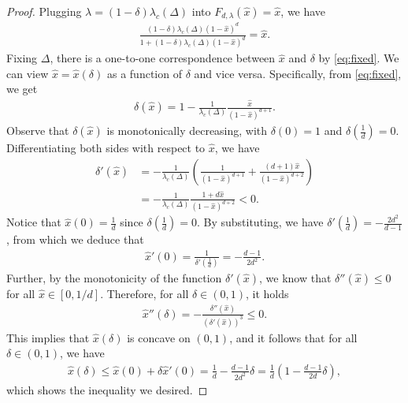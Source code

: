 \documentclass[10pt,a4paper]{amsart}
\newcommand{\tp}{\tuple}
\newcommand{\tuple}[1]{\left(#1\right)}
\begin{document}
\begin{proof}
    Plugging $\lambda = (1-\delta) \lambda_c(\Delta)$ into $F_{d,\lambda}(\hat x)=\hat x$, we have
    \begin{align} \label{eq:fixed}
        \frac{(1-\delta)\lambda_c(\Delta)(1-\hat x)^d}{1+(1-\delta)\lambda_c(\Delta)(1-\hat x)^d}=\hat x.
    \end{align} 
    Fixing $\Delta$, there is a one-to-one correspondence between $\hat x$ and $\delta$ by \cref{eq:fixed}.
    We can view $\hat x = \hat x (\delta)$ as a function of $\delta$ and vice versa.
    Specifically, from \cref{eq:fixed}, we get
    \begin{align*}
        \delta(\hat x) = 1-\frac{1}{\lambda_c(\Delta)}\frac{\hat x}{(1-\hat x)^{d+1}}.
    \end{align*}
    Observe that $\delta(\hat x)$ is monotonically decreasing, with $\delta(0)=1$ and $\delta(\frac{1}{d})=0$.
    Differentiating both sides with respect to $\hat x$, we have
    \begin{align*}
        \delta'(\hat x) &= -\frac{1}{\lambda_c(\Delta)}\tp{\frac{1}{(1-\hat x)^{d+1}}+\frac{(d+1)\hat x}{(1-\hat x)^{d+2}}}\\
        &=-\frac{1}{\lambda_c(\Delta)}\frac{1+d\hat x}{(1-\hat x)^{d+2}} < 0.
    \end{align*}
    Notice that $\hat x(0)=\frac{1}{d}$ since $\delta(\frac{1}{d}) = 0$.
    By substituting, we have $\delta'(\frac{1}{d})=-\frac{2d^2}{d-1}$, from which we deduce that
    \begin{align*}
        \hat x'(0)=\frac{1}{\delta'(\frac{1}{d})}=-\frac{d-1}{2d^2}.
    \end{align*}
    Further, by the monotonicity of the function $\delta'(\hat{x})$, we know that $\delta''(\hat x)\leq0$ for all $\hat x\in[0,1/d]$.
    Therefore, for all $\delta\in(0,1)$, it holds
    \begin{align*}
        \hat x''(\delta)=-\frac{\delta''(\hat x)}{(\delta'(\hat x))^3} \leq 0.
    \end{align*}
    This implies that $\hat x(\delta)$ is concave on $(0,1)$, 
    and it follows that for all $\delta \in (0,1)$, we have
    \begin{align*}
        \hat x(\delta)\leq\hat x(0)+\delta \hat x'(0)=\frac{1}{d}-\frac{d-1}{2d^2}\delta=\frac{1}{d}\tp{1-\frac{d-1}{2d}\delta},
    \end{align*}
    which shows the inequality we desired.
\end{proof}    
\end{document}
